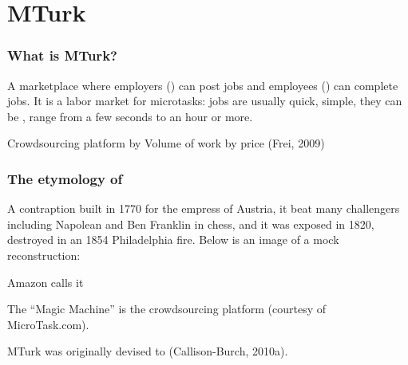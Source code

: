 \documentclass[slides]{beamer} %
\begin{document}
\section{MTurk}

\begin{frame}\frametitle{What is MTurk?}
\pause

\scriptsize
A marketplace where employers () can post jobs and employees () can complete jobs. It is a labor market for microtasks: jobs are usually quick, simple, they can be , range from a few seconds to an hour or more. \pause


\centering
Crowdsourcing platform by Volume of work by price (Frei, 2009)

\end{frame}

\begin{frame}\frametitle{The etymology of }

\scriptsize

A contraption built in 1770 for the empress of Austria, it beat many challengers including Napolean and Ben Franklin in chess, and it was exposed in 1820, destroyed in an 1854 Philadelphia fire. Below is an image of a mock reconstruction:

 \pause

\centering
Amazon calls it 

\end{frame}

\begin{frame}


\scriptsize
\centering
The ``Magic Machine'' is the crowdsourcing platform (courtesy of MicroTask.com). \\
\vspace{0.2cm}

MTurk was originally devised to  (Callison-Burch, 2010a).

\end{frame}
\end{document}
